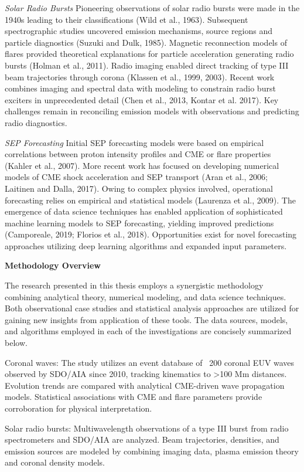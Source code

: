 \textit{Solar Radio Bursts}
Pioneering observations of solar radio bursts were made in the 1940s leading to their classifications (Wild et al., 1963). Subsequent spectrographic studies uncovered emission mechanisms, source regions and particle diagnostics (Suzuki and Dulk, 1985). Magnetic reconnection models of flares provided theoretical explanations for particle acceleration generating radio bursts (Holman et al., 2011). Radio imaging enabled direct tracking of type III beam trajectories through corona (Klassen et al., 1999, 2003). Recent work combines imaging and spectral data with modeling to constrain radio burst exciters in unprecedented detail (Chen et al., 2013, Kontar et al. 2017). Key challenges remain in reconciling emission models with observations and predicting radio diagnostics.

\textit{SEP Forecasting}
Initial SEP forecasting models were based on empirical correlations between proton intensity profiles and CME or flare properties (Kahler et al., 2007). More recent work has focused on developing numerical models of CME shock acceleration and SEP transport (Aran et al., 2006; Laitinen and Dalla, 2017). Owing to complex physics involved, operational forecasting relies on empirical and statistical models (Laurenza et al., 2009). The emergence of data science techniques has enabled application of sophisticated machine learning models to SEP forecasting, yielding improved predictions (Camporeale, 2019; Florios et al., 2018). Opportunities exist for novel forecasting approaches utilizing deep learning algorithms and expanded input parameters.

\textbf{Methodology Overview}

The research presented in this thesis employs a synergistic methodology combining analytical theory, numerical modeling, and data science techniques. Both observational case studies and statistical analysis approaches are utilized for gaining new insights from application of these tools. The data sources, models, and algorithms employed in each of the investigations are concisely summarized below.

Coronal waves: The study utilizes an event database of ~200 coronal EUV waves observed by SDO/AIA since 2010, tracking kinematics to >100 Mm distances. Evolution trends are compared with analytical CME-driven wave propagation models. Statistical associations with CME and flare parameters provide corroboration for physical interpretation.

Solar radio bursts: Multiwavelength observations of a type III burst from radio spectrometers and SDO/AIA are analyzed. Beam trajectories, densities, and emission sources are modeled by combining imaging data, plasma emission theory and coronal density models. 


